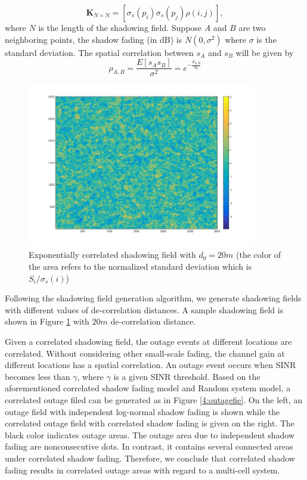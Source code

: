  \begin{equation}
 \mathbf{K}_{N\times N} = [ \sigma_{s}(p_{i})\sigma_{s}(p_{j})\rho(i,j)],
 \label{correlationmatrix}
 \end{equation}
 where $N$ is the length of the shadowing field. Suppose $A$ and $B$ are two neighboring points, the shadow fading (in dB) is $N(0,\sigma^2)$ where $\sigma$ is the standard deviation. The spatial correlation between $s_{A}$ and $s_{B}$ will be given by 
 \begin{equation}
 \rho_{A,B} = \frac{E[s_{A}s_{B}]}{\sigma^2} =e^{-\frac{d_{A,B}}{d_{0}}}
 \end{equation}
 \begin{figure}
 \centering
 \includegraphics[width = 10cm]{ShadowFieldDeCorr20.jpg}
 \caption{Exponentially correlated shadowing field with $d_{0} = 20m$ (the color of the area refers to the normalized standard deviation which is $S_{i}/\sigma_{s}(i)$)}

 \label{ch4:shadowingfield}
 \end{figure}

 Following the shadowing field generation algorithm, we generate shadowing fields with different values of de-correlation distances. A sample shadowing field is shown in Figure \ref{ch4:shadowingfield} with $20m$ de-correlation distance.

 \par Given a correlated shadowing field, the outage events at different locations are correlated. Without considering other small-scale fading, the channel gain at different locations has a spatial correlation. An outage event occurs when SINR becomes less than $\gamma$, where $\gamma$ is a given SINR threshold. Based on the aforementioned correlated shadow fading model and Random system model, a correlated outage filed can be generated as in Figure \ref{4:outagefie}. On the left, an outage field with independent log-normal shadow fading is shown while the correlated outage field with correlated shadow fading is given on the right. The black color indicates outage areas. The outage area due to independent shadow fading are nonconsecutive dots. In contrast, it contains several connected areas under correlated shadow fading. Therefore, we conclude that correlated shadow fading results in correlated outage areas with regard to a multi-cell system.

